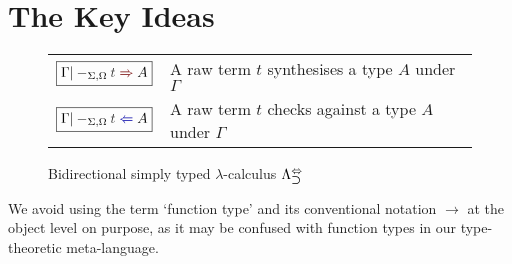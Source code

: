 
\section{The Key Ideas} \label{sec:key-ideas}
\begin{figure}
  \small
  \bgroup
  \renewcommand{\arraystretch}{1.5}
  \begin{tabular}{ r l }
    $\boxed{\Gamma |-_{\Sigma, \Omega} \isTerm{t} \syn A}$ & A raw term $t$ synthesises a type $A$ under $\Gamma$ \\
    $\boxed{\Gamma |-_{\Sigma, \Omega} \isTerm{t} \chk A}$ &A raw term $t$ checks against a type $A$ under $\Gamma$
  \end{tabular}
  \egroup
  \centering
  \caption{Bidirectional simply typed $\lambda$-calculus $\Lambda^{\Leftrightarrow}_{\mathbin{\bm{\supset}}}$}
  \label{fig:bi-stlc}
\end{figure}
\begin{remark}
  We avoid using the term `function type' and its conventional notation $\to$ at the object level on purpose, as it may be confused with function types in our type-theoretic meta-language.
\end{remark}


